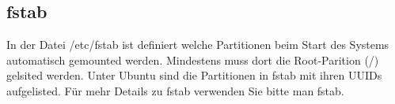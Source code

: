 \subsection{fstab}
In der Datei /etc/fstab ist definiert welche Partitionen beim Start des Systems automatisch gemounted werden. Mindestens muss dort die Root-Parition (/) gelsited werden. Unter Ubuntu sind die Partitionen in fstab mit ihren UUIDs aufgelisted. F\"ur mehr Details zu fstab verwenden Sie bitte man fstab.
